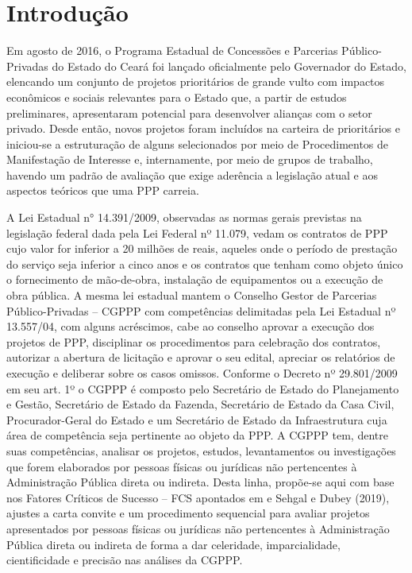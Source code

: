 \section{Introdução}
\label{sec:introducao}

Em agosto de 2016, o Programa Estadual de Concessões e Parcerias Público-Privadas do Estado do Ceará foi lançado oficialmente pelo Governador do Estado, elencando um conjunto de projetos prioritários de grande vulto com impactos econômicos e sociais relevantes para o Estado que, a partir de estudos preliminares, apresentaram potencial para desenvolver alianças com o setor privado. Desde então, novos projetos foram incluídos na carteira de prioritários e iniciou-se a estruturação de alguns selecionados por meio de Procedimentos de Manifestação de Interesse e, internamente, por meio de grupos de trabalho, havendo um padrão de avaliação que exige aderência a legislação atual e aos aspectos teóricos que uma PPP carreia.  

A Lei Estadual n° 14.391/2009, observadas as normas gerais previstas na legislação federal dada pela Lei Federal nº 11.079, vedam os contratos de PPP cujo valor for inferior a 20 milhões de reais, aqueles onde o período de prestação do serviço seja inferior a cinco anos e os contratos que tenham como objeto único o fornecimento de mão-de-obra, instalação de equipamentos ou a execução de obra pública. A mesma lei estadual mantem o Conselho Gestor de Parcerias Público-Privadas – CGPPP com competências delimitadas pela Lei Estadual nº 13.557/04, com alguns acréscimos, cabe ao conselho aprovar a execução dos projetos de PPP, disciplinar os procedimentos para celebração dos contratos, autorizar a abertura de licitação e aprovar o seu edital, apreciar os relatórios de execução e deliberar sobre os casos omissos. Conforme o Decreto nº 29.801/2009 em seu art. 1º o CGPPP é composto pelo Secretário de Estado do Planejamento e Gestão, Secretário de Estado da Fazenda, Secretário de Estado da Casa Civil, Procurador-Geral do Estado e um Secretário de Estado da Infraestrutura cuja área de competência seja pertinente ao objeto da PPP. A CGPPP tem, dentre suas competências, analisar os projetos, estudos, levantamentos ou investigações que forem elaborados por pessoas físicas ou jurídicas não pertencentes à Administração Pública direta ou indireta. Desta linha, propõe-se aqui com base nos Fatores Críticos de Sucesso – FCS apontados em  e Sehgal e Dubey (2019), ajustes a carta convite e um procedimento sequencial para avaliar projetos apresentados por pessoas físicas ou jurídicas não pertencentes à Administração Pública direta ou indireta de forma a dar celeridade, imparcialidade, cientificidade e precisão nas análises da CGPPP.

